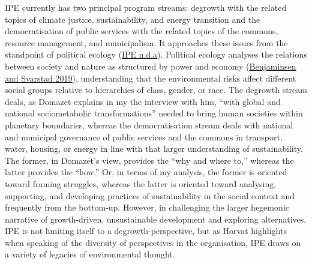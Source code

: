 \documentclass[a4paper, nobind]{templates/ociamthesis}
\begin{document}
IPE currently has two principal program streams: degrowth with the related topics of climate justice, sustainability, and energy transition and the democratisation of public services with the related topics of the commons, resource management, and municipalism. It approaches these issues from the standpoint of political ecology (\protect\hyperlink{ref-ipe_ipe_}{IPE n.d.a}). Political ecology analyses the relations between society and nature as structured by power and economy (\protect\hyperlink{ref-benjaminsen_political_2019}{Benjaminsen and Svarstad 2019}), understanding that the environmental risks affect different social groups relative to hierarchies of class, gender, or race. The degrowth stream deals, as Domazet explains in my the interview with him, ``with global and national sociometabolic transformations'' needed to bring human societies within planetary boundaries, whereas the democratisation stream deals with national and municipal governance of public services and the commons in transport, water, housing, or energy in line with that larger understanding of sustainability. The former, in Domazet's view, provides the ``why and where to,'' whereas the latter provides the ``how.'' Or, in terms of my analysis, the former is oriented toward framing struggles, whereas the latter is oriented toward analysing, supporting, and developing practices of sustainability in the social context and frequently from the bottom-up. However, in challenging the larger hegemonic narrative of growth-driven, unsustainable development and exploring alternatives, IPE is not limiting itself to a degrowth-perspective, but as Horvat highlights when speaking of the diversity of perspectives in the organisation, IPE draws on a variety of legacies of environmental thought.
\end{document}

